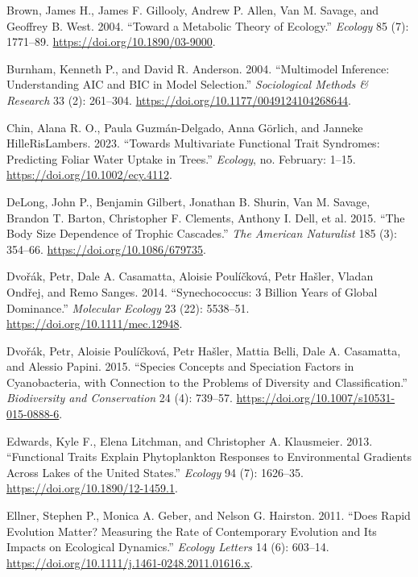 \documentclass[
  letterpaper,
  DIV=11,
  numbers=noendperiod]{scrartcl}
\newlength{\cslentryspacing}
\begin{document}
\label{refs}
\setlength{\cslentryspacing}{0em}
\begin{CSLReferences}
Brown, James H., James F. Gillooly, Andrew P. Allen, Van M. Savage, and
Geoffrey B. West. 2004. {``Toward a {Metabolic Theory} of {Ecology}.''}
\emph{Ecology} 85 (7): 1771--89. \url{https://doi.org/10.1890/03-9000}.

Burnham, Kenneth P., and David R. Anderson. 2004. {``Multimodel
{Inference}: {Understanding AIC} and {BIC} in {Model Selection}.''}
\emph{Sociological Methods \& Research} 33 (2): 261--304.
\url{https://doi.org/10.1177/0049124104268644}.

Chin, Alana R. O., Paula Guzmán-Delgado, Anna Görlich, and Janneke
HilleRisLambers. 2023. {``Towards Multivariate Functional Trait
Syndromes: {Predicting} Foliar Water Uptake in Trees.''} \emph{Ecology},
no. February: 1--15. \url{https://doi.org/10.1002/ecy.4112}.

DeLong, John P., Benjamin Gilbert, Jonathan B. Shurin, Van M. Savage,
Brandon T. Barton, Christopher F. Clements, Anthony I. Dell, et al.
2015. {``The {Body Size Dependence} of {Trophic Cascades}.''} \emph{The
American Naturalist} 185 (3): 354--66.
\url{https://doi.org/10.1086/679735}.

Dvořák, Petr, Dale A. Casamatta, Aloisie Poulíčková, Petr Hašler, Vladan
Ondřej, and Remo Sanges. 2014. {``Synechococcus: 3 Billion Years of
Global Dominance.''} \emph{Molecular Ecology} 23 (22): 5538--51.
\url{https://doi.org/10.1111/mec.12948}.

Dvořák, Petr, Aloisie Poulíčková, Petr Hašler, Mattia Belli, Dale A.
Casamatta, and Alessio Papini. 2015. {``Species Concepts and Speciation
Factors in Cyanobacteria, with Connection to the Problems of Diversity
and Classification.''} \emph{Biodiversity and Conservation} 24 (4):
739--57. \url{https://doi.org/10.1007/s10531-015-0888-6}.

Edwards, Kyle F., Elena Litchman, and Christopher A. Klausmeier. 2013.
{``Functional Traits Explain Phytoplankton Responses to Environmental
Gradients Across Lakes of the {United States}.''} \emph{Ecology} 94 (7):
1626--35. \url{https://doi.org/10.1890/12-1459.1}.

Ellner, Stephen P., Monica A. Geber, and Nelson G. Hairston. 2011.
{``Does Rapid Evolution Matter? {Measuring} the Rate of Contemporary
Evolution and Its Impacts on Ecological Dynamics.''} \emph{Ecology
Letters} 14 (6): 603--14.
\url{https://doi.org/10.1111/j.1461-0248.2011.01616.x}.


\end{CSLReferences}
\end{document}
